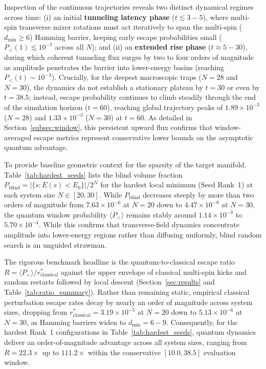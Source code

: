 \documentclass[10pt,twocolumn,a4paper]{article}
\begin{document}
Inspection of the continuous trajectories reveals two distinct dynamical regimes across time:
(i) an initial \textbf{tunneling latency phase} ($t \lesssim 3 - 5$), where multi-spin transverse mixer rotations must act iteratively to span the multi-spin ($d_{\min} \ge 6$) Hamming barrier, keeping early escape probabilities small ($P_<(1) \lesssim 10^{-7}$ across all $N$); and
(ii) an \textbf{extended rise phase} ($t \approx 5 - 30$), during which coherent tunneling flux surges by two to four orders of magnitude as amplitude penetrates the barrier into lower-energy basins (reaching $P_<(t) \sim 10^{-3}$).
Crucially, for the deepest macroscopic traps ($N = 28$ and $N = 30$), the dynamics do not establish a stationary plateau by $t = 30$ or even by $t = 38.5$; instead, escape probability continues to climb steadily through the end of the simulation horizon ($t = 60$), reaching global trajectory peaks of $1.89 \times 10^{-3}$ ($N = 28$) and $1.33 \times 10^{-3}$ ($N = 30$) at $t = 60$. As detailed in Section~\ref{subsec:window}, this persistent upward flux confirms that window-averaged escape metrics represent conservative lower bounds on the asymptotic quantum advantage.

To provide baseline geometric context for the sparsity of the target manifold, Table~\ref{tab:hardest_seeds} lists the blind volume fraction $P_{\mathrm{blind}} = |\{s : E(s) < E_0\}| / 2^N$ for the hardest local minimum (Seed Rank~1) at each system size $N \in [20, 30]$. While $P_{\mathrm{blind}}$ decreases steeply by more than two orders of magnitude from $7.63 \times 10^{-6}$ at $N = 20$ down to $4.47 \times 10^{-8}$ at $N = 30$, the quantum window probability $\langle P_< \rangle$ remains stably around $1.14 \times 10^{-3}$ to $5.70 \times 10^{-4}$. While this confirms that transverse-field dynamics concentrate amplitude into lower-energy regions rather than diffusing uniformly, blind random search is an unguided strawman. 

The rigorous benchmark headline is the quantum-to-classical escape ratio $R = \langle P_< \rangle / r_{\mathrm{classical}}^*$ against the upper envelope of classical multi-spin kicks and random restarts followed by local descent (Section~\ref{sec:results} and Table~\ref{tab:ratio_summary}). Rather than remaining static, empirical classical perturbation escape rates decay by nearly an order of magnitude across system sizes, dropping from $r_{\mathrm{classical}}^* = 3.19 \times 10^{-5}$ at $N = 20$ down to $5.13 \times 10^{-6}$ at $N = 30$, as Hamming barriers widen to $d_{\min} = 6 - 9$. Consequently, for the hardest Rank~1 configurations in Table~\ref{tab:hardest_seeds}, quantum dynamics deliver an order-of-magnitude advantage across all system sizes, ranging from $R = 22.3\times$ up to $111.2\times$ within the conservative $[10.0, 38.5]$ evaluation window.
\end{document}
